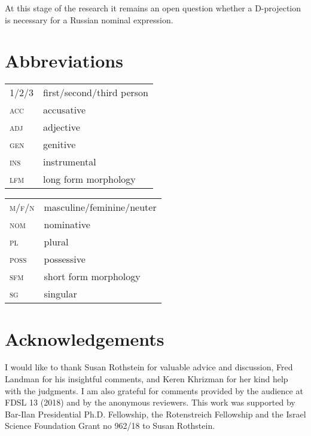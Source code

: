\documentclass[output=paper,
colorlinks,
citecolor=brown,
newtxmath
]{langscibook}
\begin{document}

\ea\label{konferencija}
\z\z 

\noindent At this stage of the research it remains an open question whether a D-projection is necessary for a Russian nominal expression.

\section*{Abbreviations}

\begin{tabularx}{.5\textwidth}{@{}lX@{}}
\textsc{1/2/3}&first/second/third person\\
\textsc{acc}&{accusative}\\
\textsc{adj}&{adjective}\\
\textsc{gen}&{genitive}\\
\textsc{ins}&{instrumental}\\
\textsc{lfm}&{long form morphology}\\
\end{tabularx}%
\begin{tabularx}{.5\textwidth}{@{}lX@{}}
\textsc{m/f/n}&{masculine/feminine/neuter}\\
\textsc{nom}&{nominative}\\
\textsc{pl}&{plural}\\
\textsc{poss}&{possessive}\\
\textsc{sfm}&{short form morphology}\\
\textsc{sg}&singular\\
\end{tabularx}

\section*{Acknowledgements}
I would like to thank Susan Rothstein for valuable advice and discussion, Fred Landman for his insightful comments, and Keren Khrizman for her kind help with the judgments. I am also grateful for comments provided by the audience at FDSL 13 (2018) and by the anonymous reviewers. This work was supported by Bar-Ilan Presidential Ph.D. Fellowship, the Rotenstreich Fellowship and the Israel Science Foundation Grant no 962/18 to Susan Rothstein.  

\sloppy
\printbibliography[heading=subbibliography,notkeyword=this]
\end{document}
